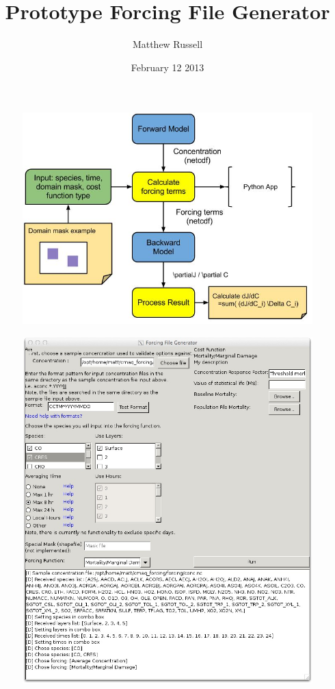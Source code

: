 \documentclass{article}
\title{Prototype Forcing File Generator}
\author{Matthew Russell}
\date{February 12 2013}
\begin{document}
\maketitle

\begin{figure}
	\centering
	\includegraphics{CMAQ-Adjoint-Process.jpg}
\end{figure}


\begin{figure}
	\centering
	\includegraphics{Forcing_App_Layout-filled.jpg}
\end{figure}
\end{document}
